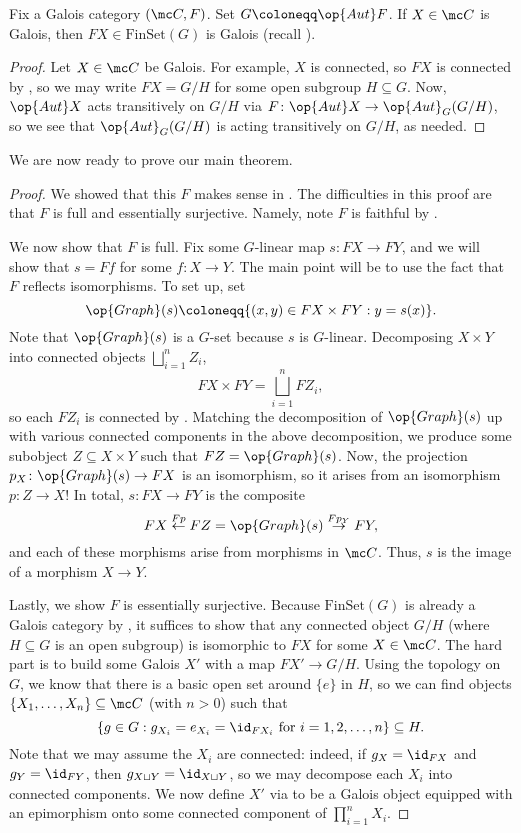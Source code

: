 \documentclass{amsart}
\begin{document}
\begin{corollary} \label{cor:galois-to-galois}
    Fix a Galois category $(\mc C,F)$. Set $G\coloneqq\op{Aut}F$. If $X\in\mc C$ is Galois, then $FX\in\mathrm{FinSet}(G)$ is Galois (recall ).
\end{corollary}
\begin{proof}
    Let $X\in\mc C$ be Galois. For example, $X$ is connected, so $FX$ is connected by , so we may write $FX=G/H$ for some open subgroup $H\subseteq G$. Now, $\op{Aut}X$ acts transitively on $G/H$ via $F\colon\op{Aut}X\to\op{Aut}_G(G/H)$, so we see that $\op{Aut}_G(G/H)$ is acting transitively on $G/H$, as needed.
\end{proof}
We are now ready to prove our main theorem.
\maingaloisthm*
\begin{proof}
    We showed that this $F$ makes sense in . The difficulties in this proof are that $F$ is full and essentially surjective. Namely, note $F$ is faithful by .

    We now show that $F$ is full. Fix some $G$-linear map $s\colon FX\to FY$, and we will show that $s=Ff$ for some $f\colon X\to Y$. The main point will be to use the fact that $F$ reflects isomorphisms. To set up, set
    \[\op{Graph}(s)\coloneqq\{(x,y)\in FX\times FY:y=s(x)\}.\]
    Note that $\op{Graph}(s)$ is a $G$-set because $s$ is $G$-linear. Decomposing $X\times Y$ into connected objects $\bigsqcup_{i=1}^nZ_i$,
    \[FX\times FY=\bigsqcup_{i=1}^nFZ_i,\]
    so each $FZ_i$ is connected by . Matching the decomposition of $\op{Graph}(s)$ up with various connected components in the above decomposition, we produce some subobject $Z\subseteq X\times Y$ such that $FZ=\op{Graph}(s)$. Now, the projection $p_X\colon\op{Graph}(s)\to FX$ is an isomorphism, so it arises from an isomorphism $p\colon Z\to X$! In total, $s\colon FX\to FY$ is the composite
    \[FX\stackrel{Fp}\leftarrow FZ=\op{Graph}(s)\stackrel{Fp_Y}\to FY,\]
    and each of these morphisms arise from morphisms in $\mc C$. Thus, $s$ is the image of a morphism $X\to Y$.

    Lastly, we show $F$ is essentially surjective. Because $\mathrm{FinSet}(G)$ is already a Galois category by , it suffices to show that any connected object $G/H$ (where $H\subseteq G$ is an open subgroup) is isomorphic to $FX$ for some $X\in\mc C$. The hard part is to build some Galois $X'$ with a map $FX'\to G/H$. Using the topology on $G$, we know that there is a basic open set around $\{e\}$ in $H$, so we can find objects $\{X_1,\ldots,X_n\}\subseteq\mc C$ (with $n>0$) such that
    \[\left\{g\in G:g_{X_i}=e_{X_i}={\id_{FX_i}}\text{ for }i=1,2,\ldots,n\right\}\subseteq H.\]
    Note that we may assume the $X_i$ are connected: indeed, if $g_X=\id_{FX}$ and $g_Y=\id_{FY}$, then $g_{X\sqcup Y}=\id_{X\sqcup Y}$, so we may decompose each $X_i$ into connected components. We now define $X'$ via  to be a Galois object equipped with an epimorphism onto some connected component of $\prod_{i=1}^nX_i$.
    

\end{proof}
\end{document}
